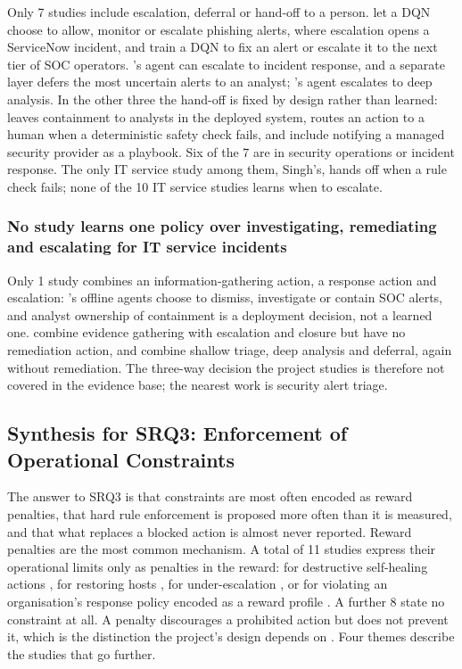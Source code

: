 \documentclass[pdflatex,sn-basic]{sn-jnl}
\begin{document}
Only 7 studies include escalation, deferral or hand-off to a person. \citet{bhosale2026} let a DQN choose to allow, monitor or escalate phishing alerts, where escalation opens a ServiceNow incident, and \citet{alturkistani2022} train a DQN to fix an alert or escalate it to the next tier of SOC operators. \citeauthor{sahin2026}'s \citeyearpar{sahin2026} agent can escalate to incident response, and a separate layer defers the most uncertain alerts to an analyst; \citeauthor{kovtun2026}'s \citeyearpar{kovtun2026} agent escalates to deep analysis. In the other three the hand-off is fixed by design rather than learned: \citet{okafor2026} leaves containment to analysts in the deployed system, \citet{singh2026} routes an action to a human when a deterministic safety check fails, and \citet{koupaei2026} include notifying a managed security provider as a playbook. Six of the 7 are in security operations or incident response. The only IT service study among them, Singh's, hands off when a rule check fails; none of the 10 IT service studies learns when to escalate.

\subsubsection{No study learns one policy over investigating, remediating and escalating for IT service incidents}

Only 1 study combines an information-gathering action, a response action and escalation: \citeauthor{okafor2026}'s \citeyearpar{okafor2026} offline agents choose to dismiss, investigate or contain SOC alerts, and analyst ownership of containment is a deployment decision, not a learned one. \citet{sahin2026} combine evidence gathering with escalation and closure but have no remediation action, and \citet{kovtun2026} combine shallow triage, deep analysis and deferral, again without remediation. The three-way decision the project studies is therefore not covered in the evidence base; the nearest work is security alert triage.

\subsection{Synthesis for SRQ3: Enforcement of Operational Constraints}

The answer to SRQ3 is that constraints are most often encoded as reward penalties, that hard rule enforcement is proposed more often than it is measured, and that what replaces a blocked action is almost never reported. Reward penalties are the most common mechanism. A total of 11 studies express their operational limits only as penalties in the reward: for destructive self-healing actions \citep{yuan2026}, for restoring hosts \citep{nyberg2024,hammar2026belief,hammar2025}, for under-escalation \citep{bhosale2026}, or for violating an organisation's response policy encoded as a reward profile \citep{hughes2022}. A further 8 state no constraint at all. A penalty discourages a prohibited action but does not prevent it, which is the distinction the project's design depends on \citep{konighofer2025}. Four themes describe the studies that go further.
\end{document}
